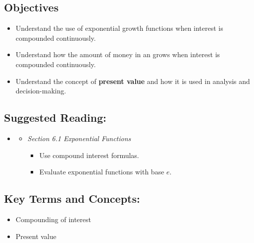
\vspace{-0.25 in}
\begin{framed}
\subsection*{Objectives}
\begin{itemize}
    \item Understand the use of exponential growth functions when interest is compounded continuously.
    \item Understand how the amount of money in an grows when interest is compounded continuously.
    \item Understand the concept of \textbf{present value} and how it is used in analysis and decision-making.
\end{itemize}

\subsection*{Suggested Reading:}
\begin{itemize}
\item \cite{openstaxColAlgebra}\footnotemark[1]
    \begin{itemize}
        \item \emph{Section 6.1 Exponential Functions}
        \begin{itemize}
            \item Use compound interest formulas.
            \item Evaluate exponential functions with base $e$.
        \end{itemize}
    \end{itemize}
\end{itemize}
\subsection*{Key Terms and Concepts:} 

\begin{itemize}
    \item Compounding of interest
    \item Present value
\end{itemize}
\end{framed}
